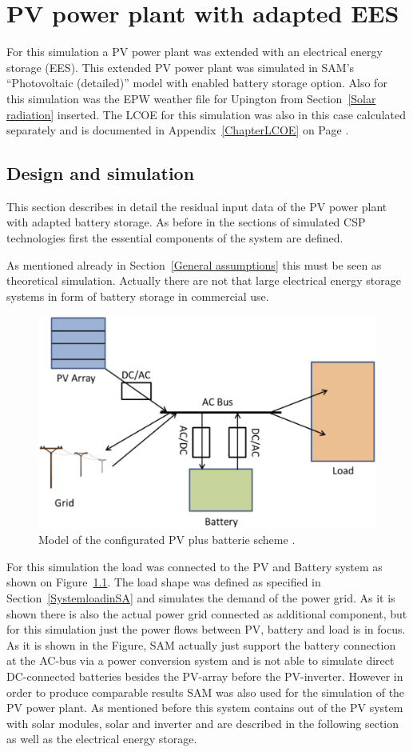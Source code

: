 \chapter{PV power plant with adapted EES}
For this simulation a PV power plant was extended with an electrical energy storage (EES). This extended PV power plant was simulated in SAM's \enquote{Photovoltaic (detailed)} model with enabled battery storage option. Also for this simulation was the EPW weather file for Upington from Section~\ref{Solar radiation} inserted. The LCOE for this simulation was also in this case calculated separately and is documented in Appendix~\ref{ChapterLCOE} on Page \pageref{ChapterLCOE}.

\section{Design and simulation} \label{section PV system}
This section describes in detail the residual input data of the PV power plant with adapted battery storage. As before in the sections of simulated CSP technologies first the essential components of the system are defined. 

As mentioned already in Section~\ref{General assumptions} this must be seen as theoretical simulation. Actually there are not that large electrical energy storage systems in form of battery storage in commercial use.

\begin{figure}[!b]  
\centering
\includegraphics[width=0.6\linewidth]{FIG/PV_model_config}
\caption[Model of the configurated PV plus batterie scheme.]{Model of the configurated PV plus batterie scheme \cite{Diorio2015}.}\label{PV_model_config}
\end{figure}
For this simulation the load was connected to the PV and Battery system as shown on Figure~\ref{PV_model_config}. The load shape was defined as specified in Section~\ref{SystemloadinSA} and simulates the demand of the power grid. As it is shown there is also the actual power grid connected as additional component, but for this simulation just the power flows between PV, battery and load is in focus. As it is shown in the Figure, SAM actually just support the battery connection at the AC-bus via a power conversion system and is not able to simulate direct DC-connected batteries besides the PV-array before the PV-inverter. However in order to produce comparable results SAM was also used for the simulation of the PV power plant. As mentioned before this system contains out of the PV system with solar modules, solar and inverter and are described in the following section as well as the electrical energy storage.

